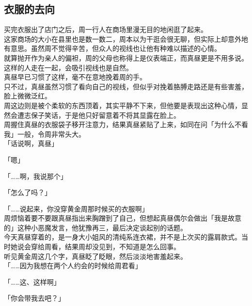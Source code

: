 \subsection{衣服的去向}

买完衣服出了店门之后，周一行人在商场里漫无目的地闲逛了起来。\\

这家商场的大小在县里也是数一数二，周本以为干逛会很无聊，但实际上却意外地有意思。虽然周不觉得辛苦，但众人的视线也让他有种难以描述的心情。\\

就算抛开作为亲人的偏袒，周的父母也称得上是仪表端正，而真昼更是不用多说。这样的人走在一起，会吸引视线也是自然。\\

真昼早已习惯了这样，毫不在意地挽着周的手。\\

只不过，真昼虽然习惯了看向自己的视线，但似乎对挽着胳膊走路还是有些害羞，脸上微微泛红。\\

周这边则是被个柔软的东西顶着，其实平静不下来，但他要是表现出这种心情，显然会遭志保子笑话，于是他只好留意着不将其显露在脸上。\\

周握住真昼的衣服袋子移开注意力，结果真昼紧贴了上来，如同在问「为什么不看我」一般，令周非常头大。\\

「话说啊，真昼」

「嗯」

「……啊，我说那个」

「怎么了吗？」

「……说起来，你没穿黄金周那时候买的衣服啊」\\

周烦恼着要不要跟真昼指出来胸蹭到了自己，但想起真昼偶尔会做出「我是故意的」这种小恶魔发言，他犹豫再三，最后决定谈起别的话题。\\

今天真昼穿着的，是一身大小姐风的清纯系连衣裙，并不是上次买的露肩款式。当时她说会穿给周看，结果周却没见到，不知道是怎么回事。\\

听见黄金周这几个字，真昼眨了眨眼，然后淡淡地害羞起来。\\

「……因为我想在两个人约会的时候给周君看」

「……这、这样啊」

「你会带我去吧？」\\

